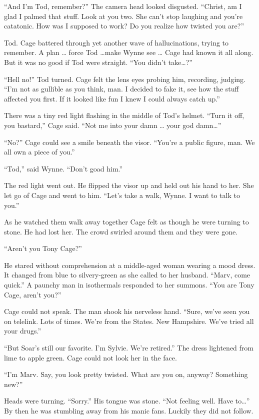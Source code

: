 “And I’m Tod, remember?” The camera head looked disgusted. “Christ, am I glad I palmed that stuff. Look at you two. She can’t stop laughing and you’re catatonic. How was I supposed to work? Do you realize how twisted you are?”

Tod. Cage battered through yet another wave of hallucinations, trying to remember. A plan … force Tod …make Wynne see … Cage had known it all along. But it was no good if Tod were straight. “You didn’t take…?”

“Hell no!” Tod turned. Cage felt the lens eyes probing him, recording, judging. “I’m not as gullible as you think, man. I decided to fake it, see how the stuff affected you first. If it looked like fun I knew I could always catch up.”

There was a tiny red light flashing in the middle of Tod’s helmet. “Turn it off, you bastard,” Cage said. “Not me into your damn … your god damn…”

“No?” Cage could see a smile beneath the visor. “You’re a public figure, man. We all own a piece of you.”

“Tod,” said Wynne. “Don’t goad him.”

The red light went out. He flipped the visor up and held out his hand to her. She let go of Cage and went to him. “Let’s take a walk, Wynne. I want to talk to you.”

As he watched them walk away together Cage felt as though he were turning to stone. He had lost her. The crowd swirled around them and they were gone.

“Aren’t you Tony Cage?”

He stared without comprehension at a middle-aged woman wearing a mood dress. It changed from blue to silvery-green as she called to her husband. “Marv, come quick.” A paunchy man in isothermals responded to her summons. “You are Tony Cage, aren’t you?”

Cage could not speak. The man shook his nerveless hand. “Sure, we’ve seen you on telelink. Lots of times. We’re from the States. New Hampshire. We’ve tried all your drugs.”

“But Soar’s still our favorite. I’m Sylvie. We’re retired.” The dress lightened from lime to apple green. Cage could not look her in the face.

“I’m Marv. Say, you look pretty twisted. What are you on, anyway? Something new?”

Heads were turning. “Sorry.” His tongue was stone. “Not feeling well. Have to…” By then he was stumbling away from his manic fans. Luckily they did not follow.

